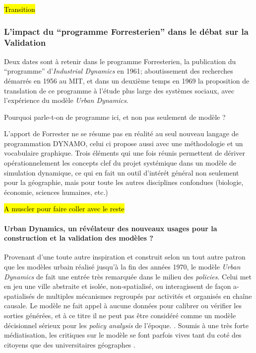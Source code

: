 
\hl{Transition}

\subsubsection{L'impact du \enquote{programme Forresterien} dans le débat sur la Validation}
\label{sssec:forrester_impact}

Deux dates sont à retenir dans le programme Forresterien, la publication du \enquote{programme} d'\textit{Industrial Dynamics} en 1961; aboutissement des recherches démarrés en 1956 au MIT, et dans un deuxième temps en 1969 la proposition de translation de ce programme à l'étude plus large des systèmes sociaux, avec l'expérience du modèle \textit{Urban Dynamics}.

Pourquoi parle-t-on de programme ici, et non pas seulement de modèle ?

L'apport de Forrester ne se résume pas en réalité au seul nouveau langage de programmation DYNAMO, celui ci propose aussi avec une méthodologie et un vocabulaire graphique. Trois éléments qui une fois réunis permettent de dériver opérationnelement les concepts clef du projet systémique dans un modèle de simulation dynamique, ce qui en fait un outil d'intérét général non seulement pour la géographie, mais pour toute les autres disciplines confondues (biologie, économie, sciences humaines, etc.) \autocite{Rosnay1975}

\hl{A muscler pour faire coller avec le reste}

\paragraph{Urban Dynamics, un révélateur des nouveaux usages pour la construction et la validation des modèles ?}
\label{p:urbanDyn_revelateur}

Provenant d'une toute autre inspiration et construit selon un tout autre patron que les modèles urbain réalisé jusqu'à la fin des années 1970, le modèle \textit{Urban Dynamics} de \textcite{Forrester1969} fait une entrée très remarquée dans le milieu des \textit{policies}. Celui met en jeu une ville abstraite et isolée, non-spatialisé, ou interagissent de façon a-spatialisés de multiples mécanismes regroupés par activités et organisés en chaîne causale. Le modèle ne fait appel à aucune données pour calibrer ou vérifier les sorties générées, et à ce titre il ne peut pas être considéré comme un modèle décisionnel sérieux pour les \textit{policy analysis} de l'époque. \autocite{Lee1973}. Soumis à une très forte médiatisation, les critiques sur le modèle se font parfois vives tant du coté des citoyens \autocite{Forrester1989, Forrester2007} que des universitaires géographes \autocite{Tobler1970a, Berry1970b, Batty1971}.

